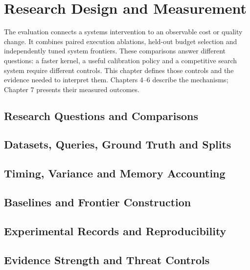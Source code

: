 \chapter{Research Design and Measurement}
\label{ch:methodology}
The evaluation connects a systems intervention to an observable cost or
quality change. It combines paired execution ablations, held-out budget
selection and independently tuned system frontiers. These comparisons answer
different questions: a faster kernel, a useful calibration policy and a
competitive search system require different controls. This chapter defines
those controls and the evidence needed to interpret them. Chapters 4--6
describe the mechanisms; Chapter 7 presents their measured outcomes.

\section{Research Questions and Comparisons}
\label{sec:3-1}


\section{Datasets, Queries, Ground Truth and Splits}
\label{sec:3-2}


\section{Timing, Variance and Memory Accounting}
\label{sec:3-3}


\section{Baselines and Frontier Construction}
\label{sec:3-4}


\section{Experimental Records and Reproducibility}
\label{sec:3-5}


\section{Evidence Strength and Threat Controls}
\label{sec:3-6}

